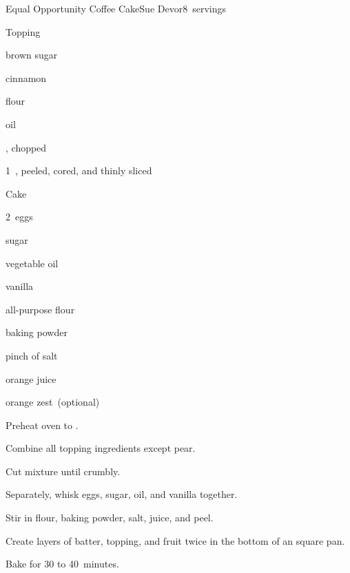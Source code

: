 \begin{recipe}{Equal Opportunity Coffee Cake}{Sue Devor}{8~servings}

Topping
\begin{ingredients}
\item \C{\half} brown sugar
\item {} cinnamon
\item {} flour
\item {} oil
\item {} , chopped
\item 1~, peeled, cored, and thinly sliced
\end{ingredients}

Cake
\begin{ingredients}
\item 2~eggs
\item {} sugar
\item \C{\half} vegetable oil
\item \tp{\half} vanilla
\item \C{1\half} all-purpose flour
\item {} baking powder
\item pinch of salt
\item \C{\half} orange juice
\item {} orange zest~(optional)
\end{ingredients}

\begin{directions}
\item Preheat oven to .
\item Combine all topping ingredients except pear.
\item Cut mixture until crumbly.
\item Separately, whisk eggs, sugar, oil, and vanilla together.
\item Stir in flour, baking powder, salt, juice, and peel.
\item Create layers of batter, topping, and fruit twice in the bottom of an  square pan.
\item Bake for 30 to 40~minutes.
\end{directions}

\end{recipe}
